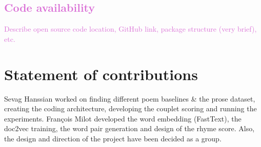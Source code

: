 \documentclass[11pt,a4paper]{article}
\begin{document}
\textcolor{Orchid}{
\subsection{Code availability}
Describe open source code location, GitHub link, package structure (very brief), etc.
}

\section{Statement of contributions}
\label{sec:contributions}
Sevag Hanssian worked on finding different poem baselines \& the prose dataset, creating the coding architecture, developing the couplet scoring and running the experiments. François Milot developed the word embedding (FastText), the doc2vec training, the word pair generation and design of the rhyme score. Also, the design and direction of the project have been decided as a group. 



\end{document}
